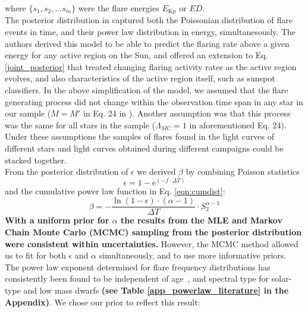 \documentclass{aa}
\begin{document}
where $\{s_1,s_2,...s_m\}$ were the flare energies $E_\mathrm{Kp}$ or $ED$.
\\
The posterior distribution in \citet{wheatland_flaresbayes_2004} captured both the Poissonian distribution of flare events in time, and their power law distribution in energy, simultanesously. The authors derived this model to be able to predict the flaring rate above a given energy for any active region on the Sun, and offered an extension to Eq. \ref{joint_posterior} that treated changing flaring activity rates as the active region evolves, and also characteristics of the active region itself, such as sunspot classifiers. In the above simplification of the model, we assumed that the flare generating process did not change within the observation time span in any star in our sample ($M=M'$ in Eq. 24 in \citet{wheatland_flaresbayes_2004}). Another assumption was that this process was the same for all stars in the sample ($\Lambda_{MC}=1$ in aforementioned Eq. 24). Under these assumptions the samples of flares found in the light curves of different stars and light curves obtained during different campaigns could be stacked together.
\\
From the posterior distribution of $\epsilon$ we derived $\beta$ by combining Poisson statistics 
\begin{equation}
\epsilon = 1 - \mathrm{e}^{(-f\cdot\Delta T)}
\label{poissonstats}
\end{equation}
and the cumulative power law function in Eq. \ref{eqn:cumdist}:
\begin{equation}
\beta = - \dfrac{\ln(1 - \epsilon)\cdot (\alpha -1)}{\Delta T} \cdot S_2^{\alpha -1}
\label{eqn:epstobeta}
\end{equation}
\textbf{With a uniform prior for $\alpha$ the results from the MLE and Markov Chain Monte Carlo (MCMC) sampling from the posterior distribution were consistent within uncertainties.} However, the MCMC method allowed us to fit for both $\epsilon$ and $\alpha$ simultaneously, and to use more informative priors. 
\\
The power law exponent determined for flare frequency distributions has consistently been found to be independent of age~\citep{davenport_flaresevolve_2019}, and spectral type for solar-type and low mass dwarfs \textbf{(see Table \ref{app_powerlaw_literature} in the Appendix)}. We chose our prior to reflect this result: 
\end{document}
